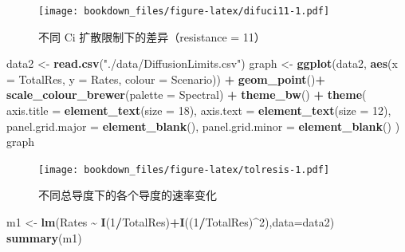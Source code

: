 \documentclass[
]{krantz}
\makeatletter
\newenvironment{Shaded}{\begin{snugshade}}{\end{snugshade}}
\newcommand{\DataTypeTok}[1]{\textcolor[rgb]{0.13,0.29,0.53}{#1}}
\newcommand{\DecValTok}[1]{\textcolor[rgb]{0.00,0.00,0.81}{#1}}
\newcommand{\KeywordTok}[1]{\textcolor[rgb]{0.13,0.29,0.53}{\textbf{#1}}}
\newcommand{\NormalTok}[1]{#1}
\newcommand{\OperatorTok}[1]{\textcolor[rgb]{0.81,0.36,0.00}{\textbf{#1}}}
\newcommand{\StringTok}[1]{\textcolor[rgb]{0.31,0.60,0.02}{#1}}
\newenvironment{kframe}{%
\medskip{}
\setlength{\fboxsep}{.8em}
 \def\at@end@of@kframe{}%
 \ifinner\ifhmode%
  \def\at@end@of@kframe{\end{minipage}}%
  \begin{minipage}{\columnwidth}%
 \fi\fi%
 \def\FrameCommand##1{\hskip\@totalleftmargin \hskip-\fboxsep
 \colorbox{shadecolor}{##1}\hskip-\fboxsep
     \hskip-\linewidth \hskip-\@totalleftmargin \hskip\columnwidth}%
 \MakeFramed {\advance\hsize-\width
   \@totalleftmargin\z@ \linewidth\hsize
   \@setminipage}}%
 {\par\unskip\endMakeFramed%
 \at@end@of@kframe}
\renewenvironment{Shaded}{\begin{kframe}}{\end{kframe}}
\makeatother
\begin{document}
\begin{figure}
\centering
\texttt{[image: bookdown\_files/figure-latex/difuci11-1.pdf]}
\caption{\label{fig:difuci11}不同 Ci 扩散限制下的差异（resistance = 11）}
\end{figure}

\begin{Shaded}
\begin{Highlighting}[]
\NormalTok{data2 \textless{}{-}}\StringTok{ }\KeywordTok{read.csv}\NormalTok{(}\StringTok{"./data/DiffusionLimits.csv"}\NormalTok{)}
\NormalTok{graph \textless{}{-}}\StringTok{ }\KeywordTok{ggplot}\NormalTok{(data2, }\KeywordTok{aes}\NormalTok{(}\DataTypeTok{x =}\NormalTok{ TotalRes, }\DataTypeTok{y =}\NormalTok{ Rates, }\DataTypeTok{colour =}\NormalTok{ Scenario)) }\OperatorTok{+}
\StringTok{  }\KeywordTok{geom\_point}\NormalTok{()}\OperatorTok{+}
\StringTok{  }\KeywordTok{scale\_colour\_brewer}\NormalTok{(}\DataTypeTok{palette =} \StringTok{\textquotesingle{}Spectral\textquotesingle{}}\NormalTok{) }\OperatorTok{+}
\StringTok{  }\KeywordTok{theme\_bw}\NormalTok{() }\OperatorTok{+}
\StringTok{  }\KeywordTok{theme}\NormalTok{(}
    \DataTypeTok{axis.title =} \KeywordTok{element\_text}\NormalTok{(}\DataTypeTok{size =} \DecValTok{18}\NormalTok{),}
    \DataTypeTok{axis.text =} \KeywordTok{element\_text}\NormalTok{(}\DataTypeTok{size =} \DecValTok{12}\NormalTok{),}
    \DataTypeTok{panel.grid.major =} \KeywordTok{element\_blank}\NormalTok{(),}
    \DataTypeTok{panel.grid.minor =} \KeywordTok{element\_blank}\NormalTok{()}
\NormalTok{  )}
\NormalTok{graph}
\end{Highlighting}
\end{Shaded}

\begin{figure}
\centering
\texttt{[image: bookdown\_files/figure-latex/tolresis-1.pdf]}
\caption{\label{fig:tolresis}不同总导度下的各个导度的速率变化}
\end{figure}

\begin{Shaded}
\begin{Highlighting}[]
\NormalTok{m1 \textless{}{-}}\StringTok{ }\KeywordTok{lm}\NormalTok{(Rates }\OperatorTok{\textasciitilde{}}\StringTok{ }\KeywordTok{I}\NormalTok{(}\DecValTok{1}\OperatorTok{/}\NormalTok{TotalRes)}\OperatorTok{+}\KeywordTok{I}\NormalTok{((}\DecValTok{1}\OperatorTok{/}\NormalTok{TotalRes)}\OperatorTok{\^{}}\DecValTok{2}\NormalTok{),}\DataTypeTok{data=}\NormalTok{data2)}
\KeywordTok{summary}\NormalTok{(m1)}
\end{Highlighting}
\end{Shaded}
\end{document}
